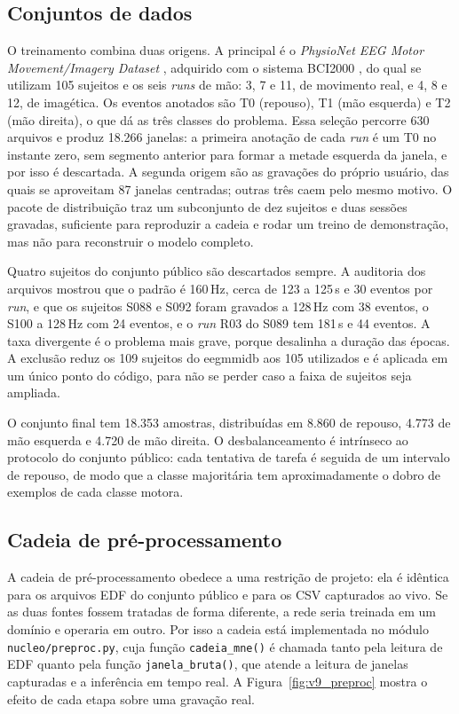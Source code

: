 \documentclass[12pt,a4paper]{article}
\begin{document}
\subsection{Conjuntos de dados}\label{subsec:dados}

O treinamento combina duas origens. A principal é o \textit{PhysioNet EEG Motor
Movement/Imagery Dataset} \cite{eegmmidb2009}, adquirido com o sistema BCI2000
\cite{schalk2004}, do qual se utilizam 105 sujeitos e os seis \textit{runs} de mão: 3, 7 e
11, de movimento real, e 4, 8 e 12, de imagética. Os eventos anotados são T0 (repouso), T1
(mão esquerda) e T2 (mão direita), o que dá as três classes do problema. Essa seleção
percorre 630 arquivos e produz 18.266 janelas: a primeira anotação de cada \textit{run} é um
T0 no instante zero, sem segmento anterior para formar a metade esquerda da janela, e por
isso é descartada. A segunda origem são as gravações do próprio usuário, das quais se
aproveitam 87 janelas centradas; outras três caem pelo mesmo motivo. O pacote de distribuição
traz um subconjunto de dez sujeitos e duas sessões gravadas, suficiente para reproduzir a
cadeia e rodar um treino de demonstração, mas não para reconstruir o modelo completo.

Quatro sujeitos do conjunto público são descartados sempre. A auditoria dos arquivos mostrou
que o padrão é 160\,Hz, cerca de 123 a 125\,s e 30 eventos por \textit{run}, e que os
sujeitos S088 e S092 foram gravados a 128\,Hz com 38 eventos, o S100 a 128\,Hz com 24
eventos, e o \textit{run} R03 do S089 tem 181\,s e 44 eventos. A taxa divergente é o problema
mais grave, porque desalinha a duração das épocas. A exclusão reduz os 109 sujeitos do
eegmmidb aos 105 utilizados e é aplicada em um único ponto do código, para não se perder caso
a faixa de sujeitos seja ampliada.

O conjunto final tem 18.353 amostras, distribuídas em 8.860 de repouso, 4.773 de mão esquerda
e 4.720 de mão direita. O desbalanceamento é intrínseco ao protocolo do conjunto público: cada
tentativa de tarefa é seguida de um intervalo de repouso, de modo que a classe majoritária
tem aproximadamente o dobro de exemplos de cada classe motora.

\subsection{Cadeia de pré-processamento}\label{subsec:preproc}

A cadeia de pré-processamento obedece a uma restrição de projeto: ela é idêntica para os
arquivos EDF do conjunto público e para os CSV capturados ao vivo. Se
as duas fontes fossem tratadas de forma diferente, a rede seria treinada em um domínio e
operaria em outro. Por isso a cadeia está implementada no módulo \texttt{nucleo/preproc.py},
cuja função \texttt{cadeia\_mne()} é chamada tanto pela leitura de EDF quanto pela função
\texttt{janela\_bruta()}, que atende a leitura de janelas capturadas e a inferência em tempo
real. A Figura~\ref{fig:v9_preproc} mostra o efeito de cada etapa sobre uma gravação real.
\end{document}
